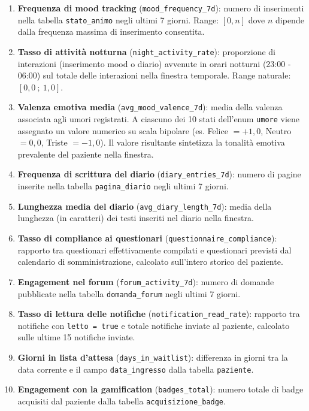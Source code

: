 \begin{enumerate}
    \item \textbf{Frequenza di mood tracking} (\texttt{mood\_frequency\_7d}): numero di inserimenti nella tabella \texttt{stato\_animo} negli ultimi 7 giorni. Range: $[0, n]$ dove $n$ dipende dalla frequenza massima di inserimento consentita.
    
    \item \textbf{Tasso di attività notturna} (\texttt{night\_activity\_rate}): proporzione di interazioni (inserimento mood o diario) avvenute in orari notturni (23:00 - 06:00) sul totale delle interazioni nella finestra temporale. Range naturale: $[0{,}0\ ;\ 1{,}0]$.
    
    \item \textbf{Valenza emotiva media} (\texttt{avg\_mood\_valence\_7d}): media della valenza associata agli umori registrati. A ciascuno dei 10 stati dell'enum \texttt{umore} viene assegnato un valore numerico su scala bipolare (es. Felice $= +1{,}0$, Neutro $= 0{,}0$, Triste $= -1{,}0$). Il valore risultante sintetizza la tonalità emotiva prevalente del paziente nella finestra.
    
    \item \textbf{Frequenza di scrittura del diario} (\texttt{diary\_entries\_7d}): numero di pagine inserite nella tabella \texttt{pagina\_diario} negli ultimi 7 giorni.
    
    \item \textbf{Lunghezza media del diario} (\texttt{avg\_diary\_length\_7d}): media della lunghezza (in caratteri) dei testi inseriti nel diario nella finestra.
    
    \item \textbf{Tasso di compliance ai questionari} (\texttt{questionnaire\_compliance}): rapporto tra questionari effettivamente compilati e questionari previsti dal calendario di somministrazione, calcolato sull'intero storico del paziente.
    
    \item \textbf{Engagement nel forum} (\texttt{forum\_activity\_7d}): numero di domande pubblicate nella tabella \texttt{domanda\_forum} negli ultimi 7 giorni.
    
    \item \textbf{Tasso di lettura delle notifiche} (\texttt{notification\_read\_rate}): rapporto tra notifiche con \texttt{letto = true} e totale notifiche inviate al paziente, calcolato sulle ultime 15 notifiche inviate.
    
    \item \textbf{Giorni in lista d'attesa} (\texttt{days\_in\_waitlist}): differenza in giorni tra la data corrente e il campo \texttt{data\_ingresso} dalla tabella \texttt{paziente}.
    
    \item \textbf{Engagement con la gamification} (\texttt{badges\_total}): numero totale di badge acquisiti dal paziente dalla tabella \texttt{acquisizione\_badge}.
\end{enumerate}

